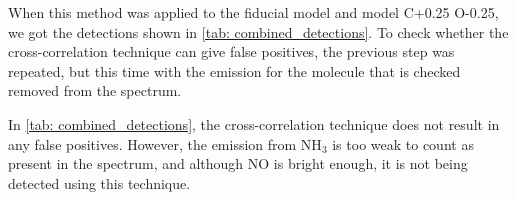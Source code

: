 \documentclass[oneside, single, authoryear, semicolon, 12pt]{lion-msc}
\newcommand{\4}{$_4$}
\newcommand{\3}{$_3$}
\newcommand{\2}{$_2$}
\begin{document}
When this method was applied to the fiducial model and model C+0.25 O-0.25, we got the detections shown in \autoref{tab: combined_detections}. To check whether the cross-correlation technique can give false positives, the previous step was repeated, but this time with the emission for the molecule that is checked removed from the spectrum.

\begin{table}[!ht]
\centering
{}
\caption{Molecular detections in the spectrum of the fiducial model (A) and the model with C+0.25 and O-0.25 (B) before and after subtracting molecular emission. A confirmed detection () indicates that the molecule is detected in the full spectrum. A molecular emission is considered present in the full spectrum when the integrated flux over the wavelength range is greater than the integrated flux of a flat continuum at 0.1 mJy over the wavelength range.}
\label{tab: combined_detections}
\end{table}

In \autoref{tab: combined_detections}, the cross-correlation technique does not result in any false positives. However, the emission from NH\3 is too weak to count as present in the spectrum, and although NO is bright enough, it is not being detected using this technique. 
\end{document}
